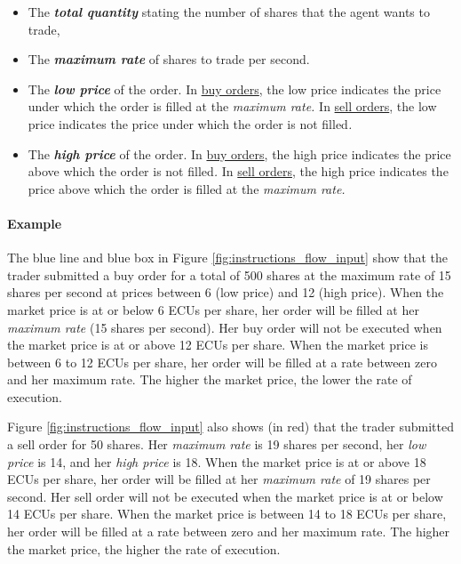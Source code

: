\begin{itemize}
\item
  The \emph{\textbf{total quantity}} stating the number of shares that
  the agent wants to trade,
\item
  The \emph{\textbf{maximum rate}} of shares to trade per second.
\item
  The \emph{\textbf{low price}} of the order. In \ul{buy orders}, the
  low price indicates the price under which the order is filled at the
  \emph{maximum rate.} In \ul{sell orders}, the low price indicates the
  price under which the order is not filled\emph{.}
\item
  The \emph{\textbf{high price}} of the order. In \ul{buy orders}, the
  high price indicates the price above which the order is not
  filled\emph{.} In \ul{sell orders}, the high price indicates the price
  above which the order is filled at the \emph{maximum rate.}
\end{itemize}

\paragraph*{Example}\label{example_flow}

The blue line and blue box in Figure \ref{fig:instructions_flow_input} show that the trader submitted a
buy order for a total of 500 shares at the maximum rate of 15 shares per
second at prices between 6 (low price) and 12 (high price). When the
market price is at or below 6 ECUs per share, her order will be filled
at her \emph{maximum rate} (15 shares per second). Her buy order will
not be executed when the market price is at or above 12 ECUs per share.
When the market price is between 6 to 12 ECUs per share, her order will
be filled at a rate between zero and her maximum rate. The higher the
market price, the lower the rate of execution.

Figure \ref{fig:instructions_flow_input} also shows (in red) that the trader submitted a sell order for
50 shares. Her \emph{maximum rate} is 19 shares per second, her
\emph{low price} is 14, and her \emph{high price} is 18. When the market
price is at or above 18 ECUs per share, her order will be filled at her
\emph{maximum rate} of 19 shares per second. Her sell order will not be
executed when the market price is at or below 14 ECUs per share. When
the market price is between 14 to 18 ECUs per share, her order will be
filled at a rate between zero and her maximum rate. The higher the
market price, the higher the rate of execution.

